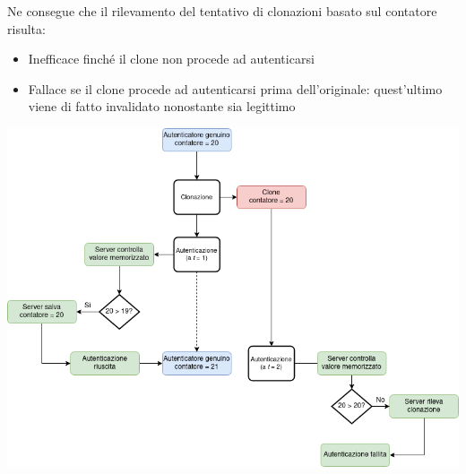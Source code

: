 Ne consegue che il rilevamento del tentativo di clonazioni basato sul contatore risulta:
\begin{itemize}
	\item Inefficace finché il clone non procede ad autenticarsi
	\item Fallace se il clone procede ad autenticarsi prima dell'originale: quest'ultimo viene di fatto invalidato nonostante sia legittimo
\end{itemize} 

\begin{center}
	\includegraphics[width=1.1\columnwidth]{figures/test}
	\label{fig:flowchart_contatore}
\end{center}